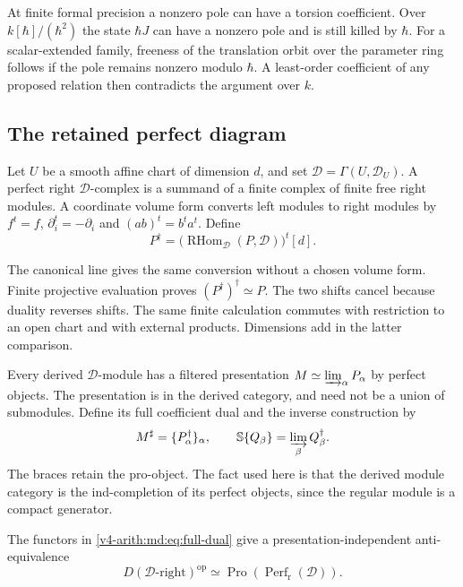 At finite formal precision a nonzero pole can have a torsion
coefficient. Over $k[\hbar]/(\hbar^2)$ the state $\hbar J$
can have a nonzero pole and is still killed by $\hbar$.
For a scalar-extended family, freeness of the translation
orbit over the parameter ring follows if the pole remains
nonzero modulo $\hbar$. A least-order coefficient of any
proposed relation then contradicts the argument over $k$.

\subsection{The retained perfect diagram}

Let $U$ be a smooth affine chart of dimension $d$, and set
$\mathcal D=\Gamma(U,\mathcal D_U)$. A perfect right
$\mathcal D$-complex is a summand of a finite complex of
finite free right modules. A coordinate volume form converts
left modules to right modules by
$f^t=f$, $\partial_i^t=-\partial_i$ and $(ab)^t=b^ta^t$.
Define
\begin{equation}\label{v4-arith:md:eq:perfect-differential-dual}
 P^\dagger=
 \bigl(\operatorname{RHom}_{\mathcal D}(P,\mathcal D)\bigr)^t[d].
\end{equation}

The canonical line gives the same conversion without a
chosen volume form. Finite projective evaluation proves
$(P^\dagger)^\dagger\simeq P$. The two shifts cancel because
duality reverses shifts. The same finite calculation commutes
with restriction to an open chart and with external products.
Dimensions add in the latter comparison.

Every derived $\mathcal D$-module has a filtered presentation
$M\simeq\varinjlim_\alpha P_\alpha$ by perfect objects.
The presentation is in the derived category, and need not
be a union of submodules. Define its full coefficient dual
and the inverse construction by
\begin{equation}\label{v4-arith:md:eq:full-dual}
 M^\sharp=\{P_\alpha^\dagger\}_\alpha,
 \qquad\mathbb S\{Q_\beta\}=\varinjlim_\beta Q_\beta^\dagger.
\end{equation}
The braces retain the pro-object. The fact used here is that
the derived module category is the ind-completion of its
perfect objects, since the regular module is a compact
generator.

\begin{proposition}
\label{v4-arith:md:prop:full}
The functors in \eqref{v4-arith:md:eq:full-dual} give a
presentation-independent anti-equivalence
\[
 D(\mathcal D\text{-right})^{\mathrm{op}}
 \simeq\operatorname{Pro}(\operatorname{Perf}_{\mathrm r}(\mathcal D)).
\]
\end{proposition}

